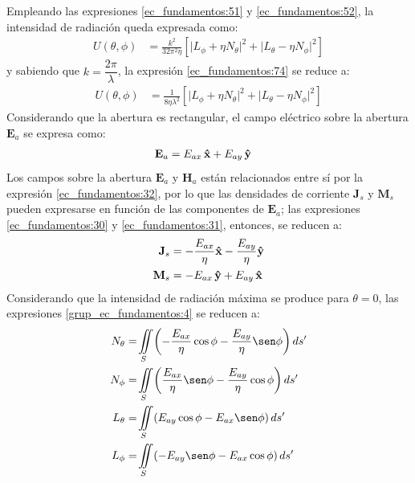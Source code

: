 Empleando las expresiones \eqref{ec_fundamentos:51} y \eqref{ec_fundamentos:52}, la intensidad de radiación queda expresada como:
\begin{align}
U\left(\theta,\phi\right) &= \frac{k^2}{32\pi^2\eta}\left[\vert L_{\phi} + \eta N_{\theta}\vert^2 + \lvert L_{\theta} - \eta N_{\phi}\rvert^2\right]
\label{ec_fundamentos:74}
\end{align}
y sabiendo que $k = \dfrac{2\pi}{\lambda}$, la expresión \eqref{ec_fundamentos:74} se reduce a:
\begin{align}
U\left(\theta,\phi\right) &= \frac{1}{8\eta\lambda^2}\left[\vert L_{\phi} + \eta N_{\theta}\vert^2 + \lvert L_{\theta} - \eta N_{\phi}\rvert^2\right]
\label{ec_fundamentos:75}
\end{align}
Considerando que la abertura es rectangular, el campo eléctrico sobre la abertura $\mathbf{E}_a$ se expresa como:
\begin{align}
\mathbf{E}_a &= E_{ax}\,\bm{\mathbf{\hat{x}}} + E_{ay}\,\bm{\mathbf{\hat{y}}} 
\label{ec_fundamentos:76}
\end{align}
Los campos sobre la abertura $\mathbf{E}_a$ y $\mathbf{H}_a$ están relacionados entre sí por la expresión \eqref{ec_fundamentos:32}, por lo que las densidades de corriente $\mathbf{J}_s$ y $\mathbf{M}_s$ pueden expresarse en función de las componentes de $\mathbf{E}_a$; las expresiones \eqref{ec_fundamentos:30} y \eqref{ec_fundamentos:31}, entonces, se reducen a:
\begin{align}
\mathbf{J}_s &= -\dfrac{E_{ax}}{\eta}\bm{\mathbf{\hat{x}}} - \dfrac{E_{ay}}{\eta}\bm{\mathbf{\hat{y}}} 
\label{ec_fundamentos:77}\\
\mathbf{M}_s &= -E_{ax}\,\bm{\mathbf{\hat{y}}} + E_{ay}\,\bm{\mathbf{\hat{x}}} 
\label{ec_fundamentos:78}
\end{align}
Considerando que la intensidad de radiación máxima se produce para $\theta = 0$, las expresiones \eqref{grup_ec_fundamentos:4} se reducen a:
\begin{subequations}
\label{grup_ec_fundamentos:7}
\begin{align}
N_{\theta} &= \!\iint\limits_S\!\left(-\dfrac{E_{ax}}{\eta}\cos\phi - \dfrac{E_{ay}}{\eta}\sen\phi\right)ds'
\label{ec_fundamentos:79}\\
N_{\phi} &= \!\iint\limits_S\!\left(\dfrac{E_{ax}}{\eta}\sen\phi - \dfrac{E_{ay}}{\eta}\cos\phi\right)ds'
\label{ec_fundamentos:80}\\
L_{\theta} &= \!\iint\limits_S\!\left(E_{ay}\cos\phi - E_{ax}\sen\phi\right)ds'
\label{ec_fundamentos:81}\\
L_{\phi} &= \!\iint\limits_S\!\left(-E_{ay}\sen\phi - E_{ax}\cos\phi\right)ds'
\label{ec_fundamentos:82}
\end{align}
\end{subequations}
